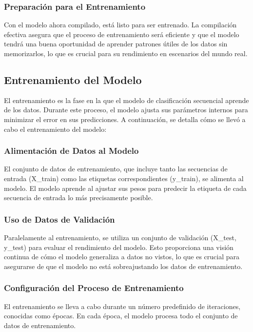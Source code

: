 \subsubsection{Preparación para el Entrenamiento} 
Con el modelo ahora compilado, está listo para ser entrenado. La compilación efectiva asegura que el proceso de entrenamiento será eficiente y que el modelo tendrá una buena oportunidad de aprender patrones útiles de los datos sin memorizarlos, lo que es crucial para su rendimiento en escenarios del mundo real.


\subsection{Entrenamiento del Modelo}

El entrenamiento es la fase en la que el modelo de clasificación secuencial aprende de los datos. Durante este proceso, el modelo ajusta sus parámetros internos para minimizar el error en sus predicciones. A continuación, se detalla cómo se llevó a cabo el entrenamiento del modelo:


\subsubsection{Alimentación de Datos al Modelo} 
El conjunto de datos de entrenamiento, que incluye tanto las secuencias de entrada (X\_train) como las etiquetas correspondientes (y\_train), se alimenta al modelo. El modelo aprende al ajustar sus pesos para predecir la etiqueta de cada secuencia de entrada lo más precisamente posible.

\subsubsection{Uso de Datos de Validación} 
Paralelamente al entrenamiento, se utiliza un conjunto de validación (X\_test, y\_test) para evaluar el rendimiento del modelo. Esto proporciona una visión continua de cómo el modelo generaliza a datos no vistos, lo que es crucial para asegurarse de que el modelo no está sobreajustando los datos de entrenamiento.

\subsubsection{Configuración del Proceso de Entrenamiento} 
El entrenamiento se lleva a cabo durante un número predefinido de iteraciones, conocidas como épocas. En cada época, el modelo procesa todo el conjunto de datos de entrenamiento.

